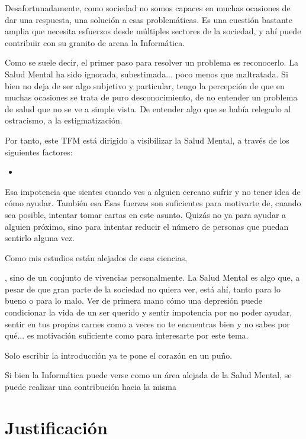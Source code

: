 Desafortunadamente, como sociedad no somos capaces en muchas ocasiones de dar una respuesta, una solución a esas problemáticas. Es una cuestión bastante amplia que necesita esfuerzos desde múltiples sectores de la sociedad, y ahí puede contribuir con su granito de arena la Informática.

Como se suele decir, el primer paso para resolver un problema es reconocerlo. La Salud Mental ha sido ignorada, subestimada... poco menos que maltratada. Si bien no deja de ser algo subjetivo y particular, tengo la percepción de que en muchas ocasiones se trata de puro desconocimiento, de no entender un problema de salud que no se ve a simple vista. De entender algo que se había relegado al ostracismo, a la estigmatización. 

Por tanto, este TFM está dirigido a visibilizar la Salud Mental, a través de los siguientes factores:

\begin{itemize}
    \item 
\end{itemize}


Esa impotencia que sientes cuando ves a alguien cercano sufrir y no tener idea de cómo ayudar. También esa  Esas fuerzas son suficientes para motivarte de, cuando sea posible, intentar tomar cartas en este asunto. Quizás no ya para ayudar a alguien próximo, sino para intentar reducir el número de personas que puedan sentirlo alguna vez. 

Como mis estudios están alejados de esas ciencias, 


, sino de un conjunto de vivencias personalmente. La Salud Mental es algo que, a pesar de que gran parte de la sociedad no quiera ver, está ahí, tanto para lo bueno o para lo malo. Ver de primera mano cómo una depresión puede condicionar la vida de un ser querido y sentir impotencia por no poder ayudar, sentir en tus propias carnes como a veces no te encuentras bien y no sabes por qué... es motivación suficiente como para interesarte por este tema.

Solo escribir la introducción ya te pone el corazón en un puño.

Si bien la Informática puede verse como un área alejada de la Salud Mental, se puede realizar una contribución hacia la misma

\section{Justificación}

